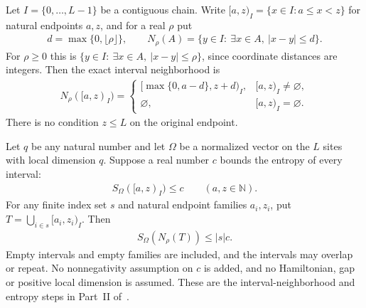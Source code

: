 \begin{lemma}
    \label{thm:chain_interval_neighborhood_entropy}
    \leanok
    Let $I=\{0,\ldots,L-1\}$ be a contiguous chain. Write
    $[a,z)_I=\{x\in I:a\le x<z\}$ for natural endpoints $a,z$, and
    for a real $\rho$ put
    \begin{align}
        d=\max\{0,\lfloor\rho\rfloor\},
        \qquad N_\rho(A)=\{y\in I:\ \exists x\in A,\ |x-y|\le d\}.
    \end{align}
    For $\rho\ge0$ this is $\{y\in I:\ \exists x\in A,\ |x-y|\le\rho\}$, since
    coordinate distances are integers.
    Then the exact interval neighborhood is
    \begin{align}
        N_\rho([a,z)_I)=
        \begin{cases}
            \lbrack\max\{0,a-d\},z+d)_I, & \lbrack a,z)_I\ne\varnothing, \\
            \varnothing,                 & [a,z)_I=\varnothing.
        \end{cases}
    \end{align}
    There is no condition $z\le L$ on the original endpoint.

    Let $q$ be any natural number and let $\Omega$ be a normalized
    vector on the $L$ sites with local dimension $q$.
    Suppose a real number $c$ bounds the entropy of every interval:
    \begin{align}
        S_\Omega([a,z)_I)\le c\qquad(a,z\in\mathbb N).
    \end{align}
    For any finite index set $s$ and natural endpoint families $a_i,z_i$,
    put $T=\bigcup_{i\in s}[a_i,z_i)_I$. Then
    \begin{align}
        S_\Omega(N_\rho(T))\le |s|c.
    \end{align}
    Empty intervals and empty families are included, and the intervals
    may overlap or repeat. No nonnegativity assumption on $c$ is added,
    and no Hamiltonian, gap or positive local dimension is assumed.
    These are the interval-neighborhood and entropy steps in Part~II
    of~\cite{TNLean2026OneDimensional}.
\end{lemma}
